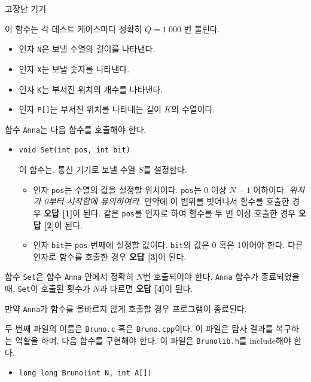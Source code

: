 \begin{problem}{고장난 기기}
\begin{itemize}
		이 함수는 각 테스트 케이스마다 정확히 $Q = 1\ 000$ 번 불린다.
		\begin{itemize}
			\item 인자 \texttt{N}은 보낼 수열의 길이를 나타낸다.
			\item 인자 \texttt{X}는 보낼 숫자를 나타낸다.
			\item 인자 \texttt{K}는 부서진 위치의 개수를 나타낸다.
			\item 인자 \texttt{P[]}는 부서진 위치를 나타내는 길이 $K$의 수열이다.
		\end{itemize}
		
		함수 \texttt{Anna}는 다음 함수를 호출해야 한다.
		\begin{itemize}
			\item \texttt{void Set(int pos, int bit)}
			
			이 함수는, 통신 기기로 보낼 수열 $S$를 설정한다.
			
			\begin{itemize}
				\item 인자 \texttt{pos}는 수열의 값을 설정할 위치이다. \texttt{pos}는 0 이상 $N-1$ 이하이다. \textit{위치가 0부터 시작함에 유의하여라.} 만약에 이 범위를 벗어나서 함수를 호출한 경우 \textbf{오답 [1]}이 된다. 같은 \texttt{pos}를 인자로 하여 함수를 두 번 이상 호출한 경우 \textbf{오답 [2]}이 된다.
				
				\item 인자 \texttt{bit}는 \texttt{pos} 번째에 설정할 값이다. \texttt{bit}의 값은 0 혹은 1이어야 한다. 다른 인자로 함수를 호출한 경우 \textbf{오답 [3]}이 된다.
			\end{itemize}
			

		\end{itemize}
	
		함수 \texttt{Set}은 함수 \texttt{Anna} 안에서 정확히 $N$번 호출되어야 한다. \texttt{Anna} 함수가 종료되었을 때, \texttt{Set}이 호출된 횟수가 $N$과 다르면 \textbf{오답 [4]}이 된다.
		
		만약 \texttt{Anna}가 함수를 올바르지 않게 호출할 경우 프로그램이 종료된다.
		
	\end{itemize}

	두 번째 파일의 이름은 \texttt{Bruno.c} 혹은 \texttt{Bruno.cpp}이다. 이 파일은 탐사 결과를 복구하는 역할을 하며, 다음 함수를 구현해야 한다. 이 파일은 \texttt{Brunolib.h}를 include해야 한다.
	
	
	\begin{itemize}
		\item \texttt{long long Bruno(int N, int A[])}
		

\end{itemize}
\end{problem}
